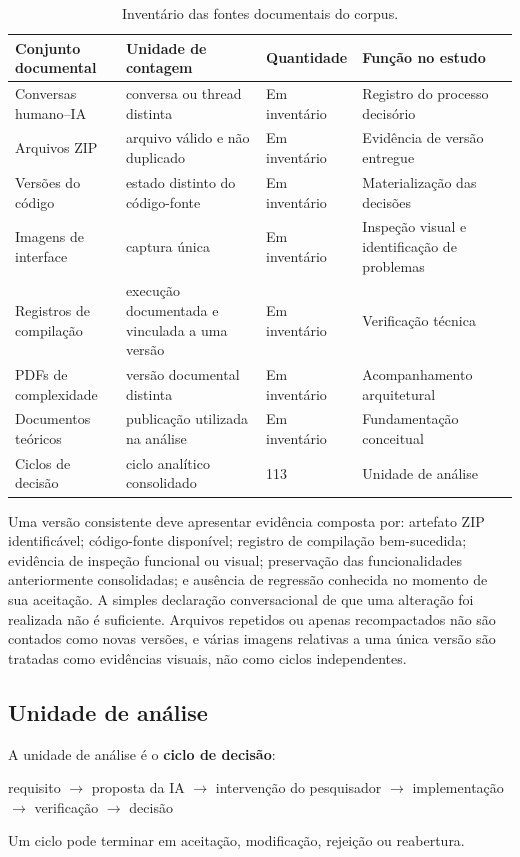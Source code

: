 \documentclass[preprint,12pt,authoryear]{elsarticle}
\begin{document}
\begin{table}[ht]
\centering
\caption{Inventário das fontes documentais do corpus.}
\label{tab:inventario-fontes}
\begin{tabularx}{\textwidth}{p{4.2cm}p{4.1cm}p{2.4cm}X}
\toprule
\textbf{Conjunto documental} & \textbf{Unidade de contagem} & \textbf{Quantidade} & \textbf{Função no estudo}\\
\midrule
Conversas humano--IA & conversa ou thread distinta & Em inventário & Registro do processo decisório\\
Arquivos ZIP & arquivo válido e não duplicado & Em inventário & Evidência de versão entregue\\
Versões do código & estado distinto do código-fonte & Em inventário & Materialização das decisões\\
Imagens de interface & captura única & Em inventário & Inspeção visual e identificação de problemas\\
Registros de compilação & execução documentada e vinculada a uma versão & Em inventário & Verificação técnica\\
PDFs de complexidade & versão documental distinta & Em inventário & Acompanhamento arquitetural\\
Documentos teóricos & publicação utilizada na análise & Em inventário & Fundamentação conceitual\\
Ciclos de decisão & ciclo analítico consolidado & 113 & Unidade de análise\\
\bottomrule
\end{tabularx}
\end{table}

Uma versão consistente deve apresentar evidência composta por: artefato ZIP identificável; código-fonte disponível; registro de compilação bem-sucedida; evidência de inspeção funcional ou visual; preservação das funcionalidades anteriormente consolidadas; e ausência de regressão conhecida no momento de sua aceitação. A simples declaração conversacional de que uma alteração foi realizada não é suficiente. Arquivos repetidos ou apenas recompactados não são contados como novas versões, e várias imagens relativas a uma única versão são tratadas como evidências visuais, não como ciclos independentes.

\subsection{Unidade de análise}
A unidade de análise é o \textbf{ciclo de decisão}:
\begin{center}
\small requisito $\rightarrow$ proposta da IA $\rightarrow$ intervenção do pesquisador $\rightarrow$ implementação $\rightarrow$ verificação $\rightarrow$ decisão
\end{center}
Um ciclo pode terminar em aceitação, modificação, rejeição ou reabertura.
\end{document}
